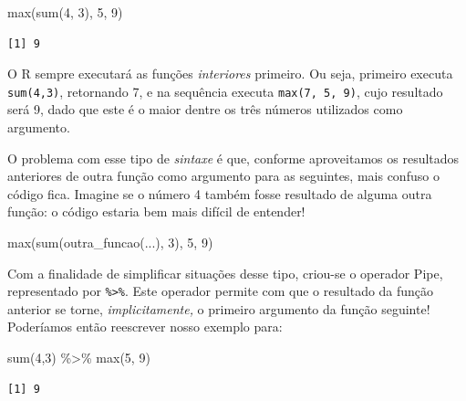 \documentclass[
  letterpaper,
  DIV=11,
  numbers=noendperiod]{scrreprt}
\newenvironment{Shaded}{\begin{snugshade}}{\end{snugshade}}
\newcommand{\DecValTok}[1]{\textcolor[rgb]{0.68,0.00,0.00}{#1}}
\newcommand{\FunctionTok}[1]{\textcolor[rgb]{0.28,0.35,0.67}{#1}}
\newcommand{\NormalTok}[1]{\textcolor[rgb]{0.00,0.23,0.31}{#1}}
\newcommand{\SpecialCharTok}[1]{\textcolor[rgb]{0.37,0.37,0.37}{#1}}
\begin{document}
\begin{Shaded}
\begin{Highlighting}[]
\FunctionTok{max}\NormalTok{(}\FunctionTok{sum}\NormalTok{(}\DecValTok{4}\NormalTok{, }\DecValTok{3}\NormalTok{), }\DecValTok{5}\NormalTok{, }\DecValTok{9}\NormalTok{)}
\end{Highlighting}
\end{Shaded}

\begin{verbatim}
[1] 9
\end{verbatim}

O R sempre executará as funções \emph{interiores} primeiro. Ou seja,
primeiro executa \texttt{sum(4,3)}, retornando 7, e na sequência executa
\texttt{max(7,\ 5,\ 9)}, cujo resultado será 9, dado que este é o maior
dentre os três números utilizados como argumento.

O problema com esse tipo de \emph{sintaxe} é que, conforme aproveitamos
os resultados anteriores de outra função como argumento para as
seguintes, mais confuso o código fica. Imagine se o número 4 também
fosse resultado de alguma outra função: o código estaria bem mais
difícil de entender!

\begin{Shaded}
\begin{Highlighting}[]
\FunctionTok{max}\NormalTok{(}\FunctionTok{sum}\NormalTok{(}\FunctionTok{outra\_funcao}\NormalTok{(...), }\DecValTok{3}\NormalTok{), }\DecValTok{5}\NormalTok{, }\DecValTok{9}\NormalTok{)}
\end{Highlighting}
\end{Shaded}

Com a finalidade de simplificar situações desse tipo, criou-se o
operador Pipe, representado por \texttt{\%\textgreater{}\%}. Este
operador permite com que o resultado da função anterior se torne,
\emph{implicitamente,} o primeiro argumento da função seguinte!
Poderíamos então reescrever nosso exemplo para:

\begin{Shaded}
\begin{Highlighting}[]
\FunctionTok{sum}\NormalTok{(}\DecValTok{4}\NormalTok{,}\DecValTok{3}\NormalTok{) }\SpecialCharTok{\%\textgreater{}\%} \FunctionTok{max}\NormalTok{(}\DecValTok{5}\NormalTok{, }\DecValTok{9}\NormalTok{)}
\end{Highlighting}
\end{Shaded}

\begin{verbatim}
[1] 9
\end{verbatim}
\end{document}
